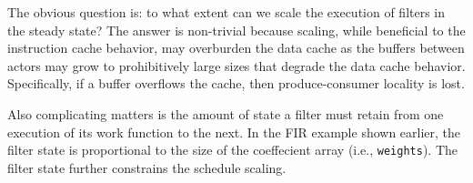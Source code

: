 The obvious question is: to what extent can we scale the execution of
filters in the steady state? The answer is non-trivial because
scaling, while beneficial to the instruction cache behavior, may
overburden the data cache as the buffers between actors may grow to
prohibitively large sizes that degrade the data cache
behavior. Specifically, if a buffer overflows the cache, then
produce-consumer locality is lost. 

Also complicating matters is the amount of state a filter must retain
from one execution of its work function to the next. In the FIR
example shown earlier, the filter state is proportional to the size of
the coeffecient array (i.e., \texttt{weights}). The filter state
further constrains the schedule scaling.
